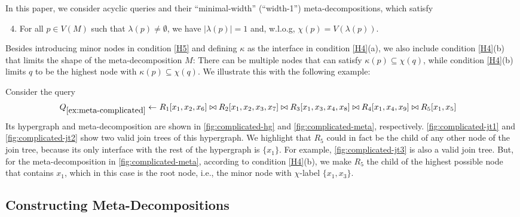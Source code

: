 In this paper, we consider acyclic queries and their ``minimal-width'' (``width-1'') meta-decompositions, which satisfy
\begin{enumerate}[label=(C\textsubscript{\arabic*}),ref=(C\textsubscript{\arabic*}),leftmargin=*]
    \setcounter{enumi}{3}
    \item[{\crtcrossreflabel{(C$_3''$)}[H3'']}] For all $p \in V(M)$ such that $\lambda(p) \neq \emptyset$, we have $|\lambda(p)| = 1$ and, w.l.o.g, $\chi(p) = V(\lambda(p))$.
\end{enumerate}

Besides introducing minor nodes in condition \ref{H5} and defining $\kappa$ as the interface in condition \ref{H4}(a), we also include condition \ref{H4}(b) that limits the shape of the meta-decomposition $M$: There can be multiple nodes that can satisfy $\kappa(p) \subseteq \chi(q)$, while condition \ref{H4}(b) limits $q$ to be the highest node with $\kappa(p) \subseteq \chi(q)$. We illustrate this with the following example:

\begin{example} \label{ex:meta-complicated}
    Consider the query
    \begin{align*}
        Q_{\ref{ex:meta-complicated}} \gets\ & R_1[x_1, x_2, x_6] \bowtie R_2[x_1, x_2, x_3, x_7] \bowtie R_3[x_1, x_3, x_4, x_8]
        \bowtie R_4[x_1, x_4, x_9] \bowtie R_5[x_1, x_{5}]
    \end{align*}
    Its hypergraph and meta-decomposition are shown in \cref{fig:complicated-hg} and \cref{fig:complicated-meta}, respectively.
    \cref{fig:complicated-jt1} and \cref{fig:complicated-jt2} show two valid join trees of this hypergraph. We highlight that $R_5$ could in fact be the child of any other node of the join tree, because its only interface with the rest of the hypergraph is $\{ x_1 \}$. For example, \cref{fig:complicated-jt3} is also a valid join tree.
    But, for the meta-decomposition in \cref{fig:complicated-meta}, according to condition \ref{H4}(b), we make $R_5$ the child of the highest possible node that contains $x_1$, which in this case is the root node, i.e., the minor node with $\chi$-label $\{ x_1, x_3 \}$.
    
    
\end{example}


\subsection{Constructing Meta-Decompositions}

